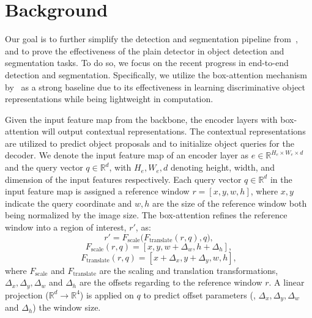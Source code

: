\section{Background}
\label{sec:background}
Our goal is to further simplify the detection and segmentation pipeline from~\cite{zhu2021deformable,li2022vitdet,nguyen2022boxer}, and to prove the effectiveness of the plain detector in object detection and segmentation tasks. To do so, we focus on the recent progress in end-to-end detection and segmentation. Specifically, we utilize the box-attention mechanism by~\cite{nguyen2022boxer} as a strong baseline due to its effectiveness in learning discriminative object representations while being lightweight in computation. 

Given the input feature map from the backbone, the encoder layers with box-attention will output contextual representations. The contextual representations are utilized to predict object proposals and to initialize object queries for the decoder. We denote the input feature map of an encoder layer as $e \in \mathbb{R}^{H_e \times W_e \times d}$ and the query vector $q \in \mathbb{R}^d$, with $H_e, W_e, d$ denoting height, width, and dimension of the input features respectively. Each query vector $q \in \mathbb{R}^d$ in the input feature map is assigned a reference window $r {=} [x, y, w, h]$, where $x, y$ indicate the query coordinate and $w, h$ are the size of the reference window both being normalized by the image size. The box-attention refines the reference window into a region of interest, $r'$, as:
%
\begin{equation}
    r' = F_\text{scale}\big(F_\text{translate}(r, q), q\big), 
\end{equation}
\begin{equation}
    F_\text{scale}(r, q) = [x, y, w + \Delta_w, h + \Delta_h], 
\end{equation}
\begin{equation}
    F_\text{translate}(r, q) = [x + \Delta_x, y + \Delta_y, w, h],
\end{equation}
%
where $F_\text{scale}$ and $F_\text{translate}$ are the scaling and translation transformations, $\Delta_x, \Delta_y, \Delta_w$ and $\Delta_h$ are the offsets regarding to the reference window $r$. A linear projection ($\mathbb{R}^d \rightarrow \mathbb{R}^{4}$) is applied on $q$ to predict offset parameters (\ie, $\Delta_x, \Delta_y, \Delta_w$ and $\Delta_h$) \wrt the window size.

